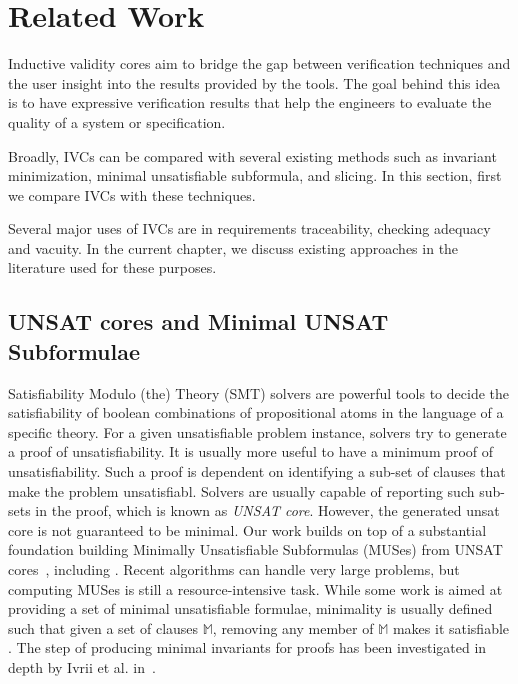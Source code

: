 \chapter{Related Work}
\label{ch:rel}
Inductive validity cores aim to bridge the gap between verification techniques and the user insight into the results provided by the tools. The goal behind this idea is to have expressive verification results that help the engineers to evaluate the quality of a system or specification.

Broadly, IVCs can be compared with several existing methods such as invariant minimization, minimal unsatisfiable subformula, and slicing. In this section, first we compare IVCs with these techniques.

Several major uses of IVCs are in requirements traceability, checking adequacy and vacuity. In the current chapter, we discuss existing approaches in the literature used for these purposes.

\section{UNSAT cores and Minimal UNSAT Subformulae}
Satisfiability Modulo (the) Theory (SMT) solvers are powerful tools to decide the
satisfiability of boolean combinations
of propositional atoms in the language of a specific theory. For a given unsatisfiable problem instance, solvers try to generate a proof of unsatisfiability. It is usually more useful to have a minimum proof of unsatisfiability. Such a proof is dependent on identifying a sub-set of clauses that make the problem unsatisfiabl. Solvers are usually capable of reporting such sub-sets in the proof, which is known as \emph{UNSAT core}. However, the generated unsat core is not guaranteed to be minimal.
Our work builds on top of a substantial foundation building Minimally Unsatisfiable Subformulas
(MUSes) from UNSAT cores~\cite{Cimatti2007:UNSAT}, including \cite{marques2010minimal, belov2012towards, ryvchin2011faster, belov2012computing, nadel2010boosting}.  Recent algorithms can handle very large problems, but computing MUSes is still a resource-intensive task.  While some work is aimed at providing a set of minimal unsatisfiable formulae, minimality is usually defined such that given a set of clauses $\mathbb{M}$, removing any member of $\mathbb{M}$ makes it satisfiable \cite{belov2012computing}.  The step of producing minimal invariants for proofs has been investigated in depth by Ivrii et al. in~\cite{Ivrii14:invariants}.

